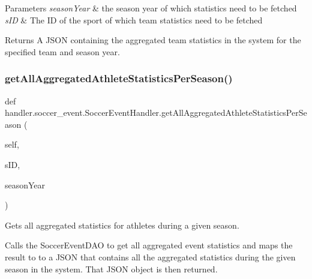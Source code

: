 \begin{DoxyParams}{Parameters}
{\em season\+Year} & the season year of which statistics need to be fetched \\
\hline
{\em s\+ID} & The ID of the sport of which team statistics need to be fetched\\
\hline
\end{DoxyParams}
\begin{DoxyReturn}{Returns}
A J\+S\+ON containing the aggregated team statistics in the system for the specified team and season year. 
\end{DoxyReturn}
\mbox{\label{classhandler_1_1soccer__event_1_1_soccer_event_handler_a292389fd792d50d23a74b8d58ffde43a}} 
\subsubsection{\texorpdfstring{get\+All\+Aggregated\+Athlete\+Statistics\+Per\+Season()}{getAllAggregatedAthleteStatisticsPerSeason()}}
{\footnotesize\ttfamily def handler.\+soccer\+\_\+event.\+Soccer\+Event\+Handler.\+get\+All\+Aggregated\+Athlete\+Statistics\+Per\+Season (\begin{DoxyParamCaption}\item[{}]{self,  }\item[{}]{s\+ID,  }\item[{}]{season\+Year }\end{DoxyParamCaption})}



Gets all aggregated statistics for athletes during a given season. 

Calls the Soccer\+Event\+D\+AO to get all aggregated event statistics and maps the result to to a J\+S\+ON that contains all the aggregated statistics during the given season in the system. That J\+S\+ON object is then returned.


